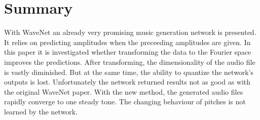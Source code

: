 \documentclass[10pt,conference,compsocconf]{IEEEtran}
\begin{document}
\section{Summary}
With WaveNet an already very promising music generation network is presented. It relies on predicting amplitudes when the preceeding amplitudes are given. In this paper it is investigated whether transforming the data to the Fourier space improves the predictions. After transforming, the dimensionality of the audio file is vastly diminished. But at the same time, the ability to quantize the network's outputs is lost. Unfortunately the network returned results not as good as with the original WaveNet paper. With the new method, the generated audio files rapidly converge to one steady tone. The changing behaviour of pitches is not learned by the network.



\end{document}
